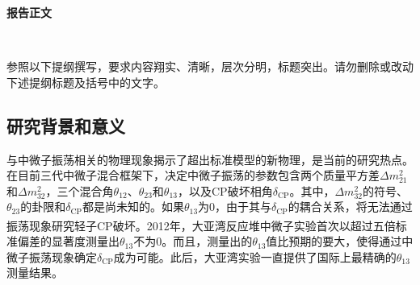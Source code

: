 \documentclass[a4paper,zihao=-4]{article}
\newcommand{\citess}[1]{\textsuperscript{\cite{#1}}}
\begin{document}
\songti

\setlength{\abovedisplayskip}{0pt}
\setlength{\belowdisplayskip}{0pt}

\begin{center}
	{\kaishu {} \textbf{报告正文} \vspace{-3ex}}
\end{center}  

\thispagestyle{empty} 　　　%


{\kaishu {}参照以下提纲撰写，要求内容翔实、清晰，层次分明，标题突出。}\alert{请勿删除或改动下述提纲标题及括号中的文字。\vspace{9bp}}



\subsection{研究背景和意义}
与中微子振荡相关的物理现象揭示了超出标准模型的新物理，是当前的研究热点。在目前三代中微子混合框架下，决定中微子振荡的参数包含两个质量平方差$\Delta m_{21}^2$和$\Delta m_{32}^2$，三个混合角$\theta_{12}$、$\theta_{23}$和$\theta_{13}$，以及CP破坏相角$\delta_{\text{CP}}$。其中，$\Delta m_{32}^2$的符号、$\theta_{23}$的卦限和$\delta_{\text{CP}}$都是尚未知的。如果$\theta_{13}$为0，由于其与$\delta_{\text{CP}}$的耦合关系，将无法通过振荡现象研究轻子CP破坏。2012年，大亚湾反应堆中微子实验\citess{DayaBay:2012fng}首次以超过五倍标准偏差的显著度测量出$\theta_{13}$不为0。而且，测量出的$\theta_{13}$值比预期的要大，使得通过中微子振荡现象确定$\delta_{\text{CP}}$成为可能。此后，大亚湾实验一直提供了国际上最精确的$\theta_{13}$测量结果。
\end{document}
